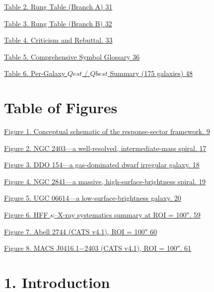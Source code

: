 \hyperref[_Toc222952632]{Table 2. Rung Table (Branch A) \hyperref[_Toc222952632]{31}}

\hyperref[_Toc222952633]{Table 3. Rung Table (Branch B) \hyperref[_Toc222952633]{32}}

\hyperref[_Toc222952634]{Table 4. Criticism and Rebuttal. \hyperref[_Toc222952634]{33}}

\hyperref[_Toc222952635]{Table 5. Comprehensive Symbol Glossary \hyperref[_Toc222952635]{36}}

\hyperref[_Toc222952636]{Table 6. Per-Galaxy \(Qest\) / \(Qbest\) Summary (175 galaxies) \hyperref[_Toc222952636]{48}}

\section{Table of Figures}\label{table-of-figures}

\hyperref[_Toc222952637]{Figure 1. Conceptual schematic of the response-sector framework. \hyperref[_Toc222952637]{9}}

\hyperref[_Toc222952638]{Figure 2. NGC 2403---a well-resolved, intermediate-mass spiral. \hyperref[_Toc222952638]{17}}

\hyperref[_Toc222952639]{Figure 3. DDO 154---a gas-dominated dwarf irregular galaxy. \hyperref[_Toc222952639]{18}}

\hyperref[_Toc222952640]{Figure 4. NGC 2841---a massive, high-surface-brightness spiral. \hyperref[_Toc222952640]{19}}

\hyperref[_Toc222952641]{Figure 5. UGC 06614---a low-surface-brightness galaxy. \hyperref[_Toc222952641]{20}}

\hyperref[_Toc222952642]{Figure 6. HFF \(\kappa\)--X-ray systematics summary at ROI = 100″. \hyperref[_Toc222952642]{59}}

\hyperref[_Toc222952643]{Figure 7. Abell 2744 (CATS v4.1), ROI = 100″ \hyperref[_Toc222952643]{60}}

\hyperref[_Toc222952644]{Figure 8. MACS J0416.1−2403 (CATS v4.1), ROI = 100″. \hyperref[_Toc222952644]{61}}

\section{}\label{section-2}

\section{1. Introduction}\label{introduction}

